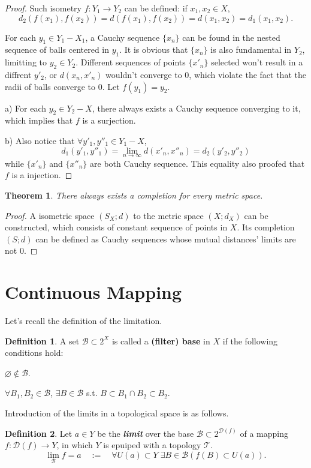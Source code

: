 \documentclass[openany]{book}
\newcommand*{\indexbf}[1]{\emph{\textbf{#1}}\index{#1}} %
\theoremstyle{plain}
\newtheorem{theorem}{Theorem}[section] %
\theoremstyle{definition}
\newtheorem{definition}{Definition}[section] %
\begin{document}
\begin{proof}
Such isometry $f:Y_1\to Y_2$ can be defined: if $x_1,x_2\in X$, 
\[
	d_2( f(x_1) , f(x_2) )=d(f(x_1), f(x_2)) = d(x_1 , x_2)=d_1(x_1, x_2).
\]

For each $y_1\in Y_1 - X_1$, a Cauchy sequence $\{x_n\}$ can be found in the nested sequence of balls centered in $y_1$. It is obvious that $\{x_n\}$ is also fundamental in $Y_2$, limitting to $y_2\in Y_2$. Different sequences of points $\{x'_n\}$ selected won't result in a diffrent $y'_2$, or $d(x_n,x'_n)$ wouldn't converge to $0$, which violate the fact that the radii of balls converge to $0$. Let $f(y_1)=y_2$. 

a) For each $y_2\in Y_2 - X$, there always exists a Cauchy sequence converging to it, which implies that $f$ is a surjection.

b) Also notice that $\forall y'_1,y''_1\in Y_1 - X$,
\[
	d_1(y'_1,y''_1)= \lim_{n\to\infty} d(x'_n,x''_n)=d_2(y'_2,y''_2)
\]
while $\{x'_n\}$ and $\{x''_n\}$ are both Cauchy sequence. This equality also proofed that $f$ is a injection.
\end{proof}
\begin{theorem}\label{completion_exists}
There always exists a completion for every metric space.
\end{theorem}
\begin{proof}
	A isometric space $(S_X;d)$ to the metric space $(X;d_X)$ can be constructed, which consists of constant sequence of points in $X$. Its completion $(S;d)$ can be defined as Cauchy sequences whose mutual distances' limits are not $0$.
\end{proof}
\section{Continuous Mapping}
Let's recall the definition of the limitation.
\begin{definition}\label{filter_base}
A set $\mathscr{B}\subset 2^X$ is called a \textbf{(filter) base} in $X$ if the following conditions hold:
\begin{conditionlist}[label=\alph*)]
\item $\varnothing \notin \mathscr{B}$.
\item $\forall B_1,B_2\in \mathscr{B}$, $\exists B\in \mathscr{B}$ s.t. $B\subset B_1\cap B_2\subset B_2$. 
\end{conditionlist}
\end{definition}
Introduction of the limits in a topological space is as follows.
\begin{definition}\label{limit}
Let $a\in Y$ be the \indexbf{limit} over the base $\mathscr{B}\subset 2^{\mathscr{D}(f)}$ of a mapping $f:\mathscr{D}( f )\to Y$, in which $Y$ is epuiped with a topology $\mathscr{T}$. 
\[
	\lim_\mathscr{B} f = a 
	\quad:=\quad
	\forall U(a)\subset Y\;
	\exists B\in \mathscr{B}(f(B)\subset U(a)).
\]
\end{definition}
\end{document}
